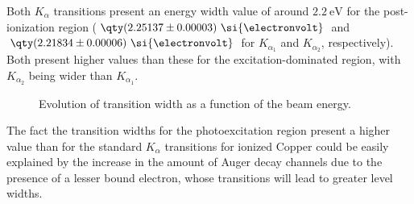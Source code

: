 Both $K_{\alpha}$ transitions present an energy width value of around $2.2\ \si{\electronvolt}$ for the post-ionization region ($\qty(2.25137\pm 0.00003)\ \si{\electronvolt}$ and $\qty(2.21834\pm 0.00006)\ \si{\electronvolt}$ for $K_{\alpha_1}$ and $K_{\alpha_2}$, respectively). Both present higher values than these for the excitation-dominated region, with $K_{\alpha_2}$ being wider than $K_{\alpha_1}$.


\begin{figure}[h!]
    \centering
    
    \caption{Evolution of transition width as a function of the beam energy.}\label{fig:width}
\end{figure}

The fact the transition widths  for the photoexcitation region present a higher value  than for the standard $K_{\alpha}$ transitions for ionized Copper could be easily explained by the increase in the amount of Auger decay channels due to the presence of a lesser bound electron, whose transitions will lead to greater level widths.


